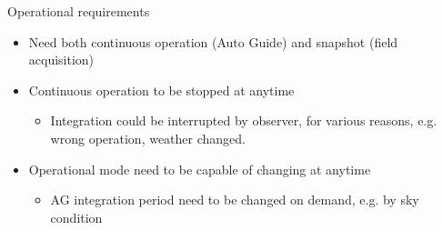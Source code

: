 \documentclass[a4paper,notitlepage]{article}
\begin{document}
Operational requirements
\begin{itemize}
  \item Need both continuous operation (Auto Guide) and snapshot (field acquisition)
  \item Continuous operation to be stopped at anytime
  \begin{itemize}
    \item Integration could be interrupted by observer, for various reasons, e.g. wrong operation, weather changed.
  \end{itemize}
  \item Operational mode need to be capable of changing at anytime
  \begin{itemize}
    \item AG integration period need to be changed on demand, e.g. by sky condition
  \end{itemize}
\end{itemize}
\end{document}
